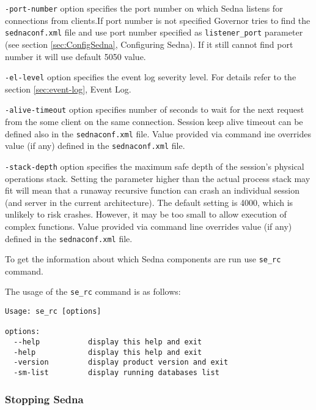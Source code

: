 \documentclass[a4paper,12pt]{article}
\begin{document}
\verb!-port-number! option specifies the port number on which Sedna listens for
connections from clients.If port number is not specified Governor tries to find
the \verb!sednaconf.xml! file and use port number specified as
\verb!listener_port! parameter (see section \ref{sec:ConfigSedna}, Configuring
Sedna). If it still cannot find port number it will use default 5050 value.

\verb!-el-level! option specifies the event log severity level. For details
refer to the section \ref{sec:event-log}, Event Log.

\verb!-alive-timeout! option specifies number of seconds to wait for the next
request from the some client on the same connection. Session keep alive timeout
can be defined also in the \verb!sednaconf.xml! file. Value provided via command
ine overrides value (if any) defined in the \verb!sednaconf.xml! file.

\verb!-stack-depth! option specifies the maximum safe depth of the session's
physical operations stack. Setting the parameter higher than the actual process
stack may fit will mean that a runaway recursive function can crash an
individual session (and server in the current architecture). The default setting
is 4000, which is unlikely to risk crashes. However, it may be too small to
allow execution of complex functions. Value provided via command line overrides
value (if any) defined in the \verb!sednaconf.xml! file.

To get the information about which Sedna components are run use \verb!se_rc!
command.

The usage of the \verb!se_rc! command is as follows:

\small{
\begin{verbatim}
Usage: se_rc [options]

options:
  --help           display this help and exit
  -help            display this help and exit
  -version         display product version and exit
  -sm-list         display running databases list
\end{verbatim}}


\subsubsection{Stopping Sedna}
\end{document}
